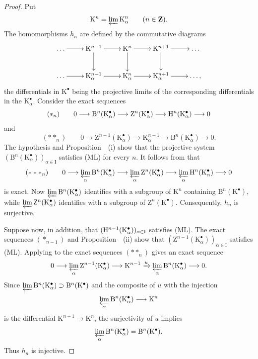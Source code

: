 \begin{proof}
Put
\[
  \mathrm{K}^n=\varprojlim\mathrm{K}^n_\alpha
  \qquad(n\in\mathbf{Z}).
\]
The homomorphisms $h_n$ are defined by the commutative diagrams
\[
  \xymatrix{
    \ldots\ar[r]
      & \mathrm{K}^{n-1}\ar[r]\ar[d]
      & \mathrm{K}^n\ar[r]\ar[d]
      & \mathrm{K}^{n+1}\ar[r]\ar[d]
      & \ldots\\
    \ldots\ar[r]
      & \mathrm{K}^{n-1}_\alpha\ar[r]
      & \mathrm{K}^n_\alpha\ar[r]
      & \mathrm{K}^{n+1}_\alpha\ar[r]
      & \ldots,
  }
\]
the differentials in $\mathrm{K}^\bullet$ being the projective limits
of the corresponding differentials in the
$\mathrm{K}^\bullet_\alpha$.
Consider the exact sequences
\[
  (*_n)\qquad
  0\longrightarrow
  \mathrm{B}^n(\mathrm{K}^\bullet_\alpha)
  \longrightarrow
  \mathrm{Z}^n(\mathrm{K}^\bullet_\alpha)
  \longrightarrow
  \mathrm{H}^n(\mathrm{K}^\bullet_\alpha)
  \longrightarrow0
\]
and
\[
  (**_n)\qquad
  0\longrightarrow
  \mathrm{Z}^{n-1}(\mathrm{K}^\bullet_\alpha)
  \longrightarrow
  \mathrm{K}^{n-1}_\alpha
  \longrightarrow
  \mathrm{B}^n(\mathrm{K}^\bullet_\alpha)
  \longrightarrow0.
\]
The hypothesis and Proposition~~(i) show that the
projective system
$(\mathrm{B}^n(\mathrm{K}^\bullet_\alpha))_{\alpha\in\mathrm{I}}$
satisfies (ML) for every $n$.
It follows from  that
\[
  (***_n)\qquad
  0\longrightarrow
  \varprojlim_\alpha\mathrm{B}^n(\mathrm{K}^\bullet_\alpha)
  \longrightarrow
  \varprojlim_\alpha\mathrm{Z}^n(\mathrm{K}^\bullet_\alpha)
  \longrightarrow
  \varprojlim_\alpha\mathrm{H}^n(\mathrm{K}^\bullet_\alpha)
  \longrightarrow0
\]
is exact.
Now
$\varprojlim\mathrm{B}^n(\mathrm{K}^\bullet_\alpha)$
identifies with a subgroup of $\mathrm{K}^{n}$ containing
$\mathrm{B}^n(\mathrm{K}^\bullet)$, while
$\varprojlim\mathrm{Z}^n(\mathrm{K}^\bullet_\alpha)$
identifies with a subgroup of $\mathrm{Z}^n(\mathrm{K}^\bullet)$.
Consequently, $h_n$ is surjective.

Suppose now, in addition, that
$(\mathrm{H}^{n-1}(\mathrm{K}^\bullet_\alpha))_{\alpha\in\mathrm{I}}$
satisfies (ML).
The exact sequences $(*_{n-1})$ and
Proposition~~(ii) show that
$(\mathrm{Z}^{n-1}(\mathrm{K}^\bullet_\alpha))_{\alpha\in\mathrm{I}}$
satisfies (ML).
Applying  to the exact sequences $(**_n)$ gives an
exact sequence
\[
  0\longrightarrow
  \varprojlim_\alpha
    \mathrm{Z}^{n-1}(\mathrm{K}^\bullet_\alpha)
  \longrightarrow
  \mathrm{K}^{n-1}
  \xrightarrow{u}
  \varprojlim_\alpha
    \mathrm{B}^n(\mathrm{K}^\bullet_\alpha)
  \longrightarrow0.
\]
Since
$\varprojlim\mathrm{B}^n(\mathrm{K}^\bullet_\alpha)
\supset\mathrm{B}^n(\mathrm{K}^\bullet)$
and the composite of $u$ with the injection
\[
  \varprojlim_\alpha\mathrm{B}^n(\mathrm{K}^\bullet_\alpha)
  \longrightarrow\mathrm{K}^n
\]
is the differential
$\mathrm{K}^{n-1}\longrightarrow\mathrm{K}^n$, the surjectivity of
$u$ implies
\[
  \varprojlim_\alpha\mathrm{B}^n(\mathrm{K}^\bullet_\alpha)
  =
  \mathrm{B}^n(\mathrm{K}^\bullet).
\]
Thus $h_n$ is injective.
\end{proof}

